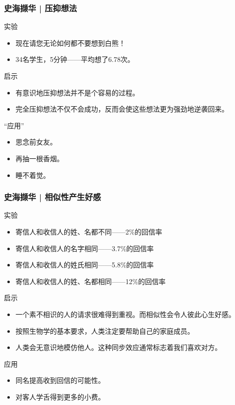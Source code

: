 \begin{frame}
  \frametitle{史海撷华 | 压抑想法}
  \begin{block}{实验}
    \begin{itemize}
      \item 现在请您无论如何都不要想到白熊！
      \item 34名学生，5分钟——平均想了6.78次。
    \end{itemize}
  \end{block}
  \pause
  \begin{block}{启示}
    \begin{itemize}
      \item 有意识地压抑想法并不是个容易的过程。
      \item 完全压抑想法不仅不会成功，反而会使这些想法更为强劲地逆袭回来。
    \end{itemize}
  \end{block}
  \pause
  \begin{block}{“应用”}
    \begin{itemize}
      \item 思念前女友。
      \item 再抽一根香烟。
      \item 睡不着觉。
    \end{itemize}
  \end{block}
\end{frame}

\begin{frame}
  \frametitle{史海撷华 | 相似性产生好感}
  \begin{block}{实验}
    \begin{itemize}
      \item 寄信人和收信人的姓、名都不同——2\%的回信率
      \item 寄信人和收信人的名字相同——3.7\%的回信率
      \item 寄信人和收信人的姓氏相同——5.8\%的回信率
      \item 寄信人和收信人的姓、名都相同——12\%的回信率
    \end{itemize}
  \end{block}
  \pause
  \begin{block}{启示}
    \begin{itemize}
      \item 一个素不相识的人的请求很难得到重视。而相似性会令人彼此心生好感。
      \item 按照生物学的基本要求，人类注定要帮助自己的家庭成员。
      \item 人类会无意识地模仿他人。这种同步效应通常标志着我们喜欢对方。
    \end{itemize}
  \end{block}
  \pause
  \begin{block}{应用}
    \begin{itemize}
      \item 同名提高收到回信的可能性。
      \item 对客人学舌得到更多的小费。
    \end{itemize}
  \end{block}
\end{frame}

